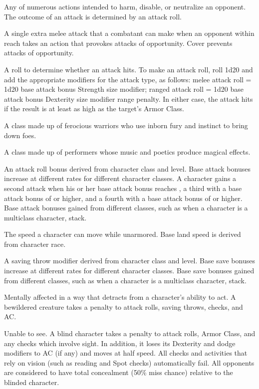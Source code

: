  Any of numerous 
actions intended to harm, disable, or neutralize an opponent. 
The outcome of an attack is 
determined by an attack roll. 

  A single extra melee attack that a combatant can 
make when an opponent within 
reach takes an action that provokes 
attacks of opportunity. Cover prevents attacks of opportunity. 

 A roll to determine 
whether an attack hits. To make 
an attack roll, roll 1d20 and add 
the appropriate modifiers for the 
attack type, as follows: melee attack roll 
= 1d20 \add base attack bonus \add Strength \add size modifier; ranged attack roll = 1d20 \add 
base attack bonus \add Dexterity \add size modifier \add range penalty. In either case, the attack hits if 
the result is at least as high as the target's Armor Class. 

 A class made up of ferocious warriors who use 
inborn fury and instinct to bring down foes. 

 A class made up of performers whose music and 
poetics produce magical effects. 

 An attack roll bonus derived from character 
class and level. Base attack bonuses increase at different rates for 
different character classes. A character gains a second attack when 
his or her base attack bonus reaches , a third with a base attack 
bonus of  or higher, and a fourth with a base attack bonus of  
or higher. Base attack bonuses gained from different classes, such as 
when a character is a multiclass character, stack. 

 The speed a character can move while unarmored. Base land speed is derived from character race. 

 A saving throw modifier derived from character class and level. Base save bonuses increase at different rates for 
different character classes. Base save bonuses gained from 
different classes, such as when a character is a multiclass 
character, stack. 

 Mentally affected in a way that detracts from a character's ability to act. A bewildered creature takes a  penalty to attack rolls, saving throws, checks, and AC.

 Unable to see. A blind character takes a  penalty to attack rolls, Armor Class, and any checks which involve sight. In addition, it loses its Dexterity and dodge modifiers to AC (if any) and moves at half speed. All checks and activities that rely on vision (such as reading and Spot checks) automatically fail. All opponents are considered to have total concealment (50\% miss chance) relative to the blinded character. 

